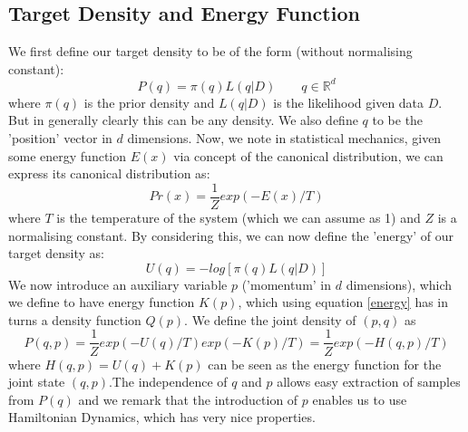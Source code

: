 \documentclass[11pt]{article}
\begin{document}
\subsection{Target Density and Energy Function}
We first define our target density to be of the form (without normalising constant):
\begin{equation}
P(q)= \pi(q)L(q|D) \quad \quad q \in \mathbb{R}^{d}
\end{equation}
where $\pi(q)$ is the prior density and $L(q|D)$ is the likelihood given data $D$. But in generally clearly this can be any density.
We also define $q$ to be the 'position' vector in $d$ dimensions. Now, we note in statistical mechanics, given some energy function $E(x)$ via concept of the canonical distribution, we can express its canonical distribution as:
\begin{equation}
\label{energy}
Pr(x) = \frac{1}{Z}exp(-E(x)/T)
\end{equation}
where $T$ is the temperature of the system (which we can assume as 1) and $Z$ is a normalising constant. By considering this, we can now define the 'energy' of our target density as:
\begin{equation}
U(q) = -log[\pi(q)L(q|D)]
\end{equation}
We now introduce an auxiliary variable $p$ ('momentum' in $d$ dimensions), which we define to have energy function $K(p)$, which using equation \ref{energy} has in turns a density function $Q(p)$. We define the joint density of $(p,q)$ as 
\begin{equation}
P(q,p) = \frac{1}{Z}exp(-U(q)/T)exp(-K(p)/T) = \frac{1}{Z}exp(-H(q,p)/T)
\end{equation}
where $H(q,p) = U(q) + K(p)$ can be seen as the energy function for the joint state $(q,p)$.The independence of $q$ and $p$ allows easy extraction of samples from $P(q)$ and we remark that the introduction of $p$ enables us to use Hamiltonian Dynamics, which has very nice properties. 
\end{document}
